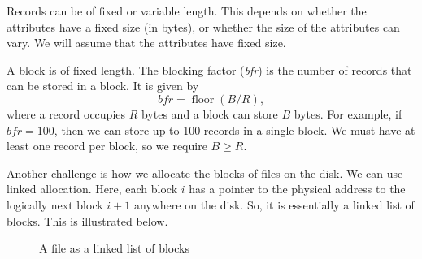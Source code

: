 \documentclass[a4paper, openany]{memoir}
\begin{document}
Records can be of fixed or variable length. This depends on whether the attributes have a fixed size (in bytes), or whether the size of the attributes can vary. We will assume that the attributes have fixed size. 


A block is of fixed length. The blocking factor (\textit{bfr}) is the number of records that can be stored in a block. It is given by
\[\textit{bfr} = \operatorname{floor}(B/R),\]
where a record occupies $R$ bytes and a block can store $B$ bytes. For example, if $\textit{bfr} = 100$, then we can store up to 100 records in a single block. We must have at least one record per block, so we require $B \geq R$.

Another challenge is how we allocate the blocks of files on the disk. We can use linked allocation. Here, each block $i$ has a pointer to the physical address to the logically next block $i+1$ anywhere on the disk. So, it is essentially a linked list of blocks. This is illustrated below.
\begin{figure}[H]
    \centering
    \caption{A file as a linked list of blocks}
\end{figure}
\end{document}
